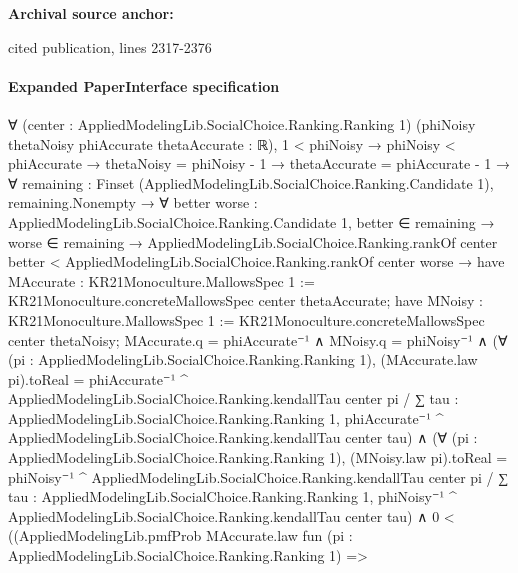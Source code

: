 \documentclass[10pt]{article}
\begin{document}
\textbf{Archival source anchor:} {\footnotesize\raggedright cited publication, lines 2317-\allowbreak{}2376\par}
\paragraph{Expanded PaperInterface specification}
\begin{ReviewVerbatim}
∀ (center : AppliedModelingLib.SocialChoice.Ranking.Ranking 1) (phiNoisy thetaNoisy phiAccurate thetaAccurate : ℝ),
  1 < phiNoisy →
    phiNoisy < phiAccurate →
      thetaNoisy = phiNoisy - 1 →
        thetaAccurate = phiAccurate - 1 →
          ∀ {remaining : Finset (AppliedModelingLib.SocialChoice.Ranking.Candidate 1)},
            remaining.Nonempty →
              ∀ {better worse : AppliedModelingLib.SocialChoice.Ranking.Candidate 1},
                better ∈ remaining →
                  worse ∈ remaining →
                    AppliedModelingLib.SocialChoice.Ranking.rankOf center better <
                        AppliedModelingLib.SocialChoice.Ranking.rankOf center worse →
                      have MAccurate : KR21Monoculture.MallowsSpec 1 :=
                        KR21Monoculture.concreteMallowsSpec center thetaAccurate;
                      have MNoisy : KR21Monoculture.MallowsSpec 1 :=
                        KR21Monoculture.concreteMallowsSpec center thetaNoisy;
                      MAccurate.q = phiAccurate⁻¹ ∧
                        MNoisy.q = phiNoisy⁻¹ ∧
                          (∀ (pi : AppliedModelingLib.SocialChoice.Ranking.Ranking 1),
                              (MAccurate.law pi).toReal =
                                phiAccurate⁻¹ ^ AppliedModelingLib.SocialChoice.Ranking.kendallTau center pi /
                                  ∑ tau : AppliedModelingLib.SocialChoice.Ranking.Ranking 1,
                                    phiAccurate⁻¹ ^ AppliedModelingLib.SocialChoice.Ranking.kendallTau center tau) ∧
                            (∀ (pi : AppliedModelingLib.SocialChoice.Ranking.Ranking 1),
                                (MNoisy.law pi).toReal =
                                  phiNoisy⁻¹ ^ AppliedModelingLib.SocialChoice.Ranking.kendallTau center pi /
                                    ∑ tau : AppliedModelingLib.SocialChoice.Ranking.Ranking 1,
                                      phiNoisy⁻¹ ^ AppliedModelingLib.SocialChoice.Ranking.kendallTau center tau) ∧
                              0 <
                                ((AppliedModelingLib.pmfProb MAccurate.law
                                      fun (pi : AppliedModelingLib.SocialChoice.Ranking.Ranking 1) =>

\end{ReviewVerbatim}
\end{document}
